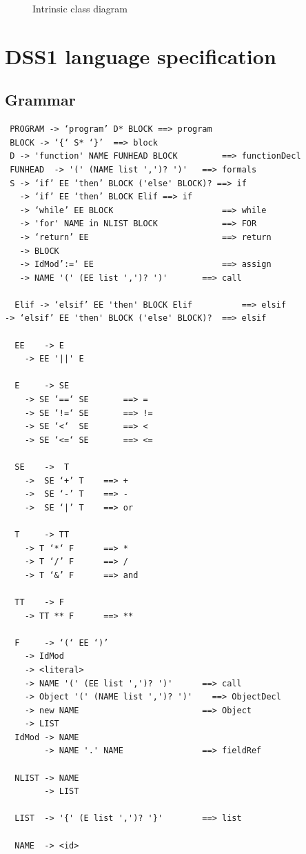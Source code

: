 \documentclass[12pt,letterpaper]{article}
\begin{document}
{\begin{figure}
\begin{center}
\begin{tikzpicture}[node distance=0.25in]
\end{tikzpicture}
\end{center}
\caption{Intrinsic class diagram}
\label{fig:INTRINSIC_DIAGRAM}
\end{figure}

\newpage \appendix 
\section{DSS1 language specification} \label{sec:LANGUAGE}

\subsection{Grammar}

\begin{verbatim}
 PROGRAM -> ‘program’ D* BLOCK ==> program
 BLOCK -> ‘{‘ S* ‘}’  ==> block
 D -> 'function' NAME FUNHEAD BLOCK      	==> functionDecl
 FUNHEAD  -> '(' (NAME list ',')? ')'  	==> formals
 S -> ‘if’ EE ‘then’ BLOCK ('else' BLOCK)? ==> if 
   -> ‘if’ EE ‘then’ BLOCK Elif ==> if 
   -> ‘while’ EE BLOCK               		==> while
   -> 'for' NAME in NLIST BLOCK     		==> FOR
   -> ‘return’ EE                    		==> return
   -> BLOCK
   -> IdMod’:=‘ EE                    		==> assign
   -> NAME '(' (EE list ',')? ')' 		==> call
 
  Elif -> ‘elsif’ EE 'then' BLOCK Elif			==> elsif
-> ‘elsif’ EE 'then' BLOCK ('else' BLOCK)?	==> elsif
  
  EE 	-> E
  	-> EE '||' E
  
  E 	-> SE
  	-> SE ‘==‘ SE   	==> =
  	-> SE ‘!=‘ SE   	==> !=
  	-> SE ‘<‘  SE   	==> <
  	-> SE ‘<=‘ SE   	==> <=
 
  SE 	->  T
  	->  SE ‘+’ T  	==> +
  	->  SE ‘-’ T  	==> -
  	->  SE ‘|’ T  	==> or
 
  T  	-> TT
  	-> T ‘*‘ F  	==> *
  	-> T ‘/’ F  	==> /
  	-> T ‘&’ F  	==> and
 
  TT 	-> F
  	-> TT ** F    	==> **
 
  F  	-> ‘(‘ EE ‘)’
  	-> IdMod 
  	-> <literal>
  	-> NAME '(' (EE list ',')? ')' 		==> call
  	-> Object '(' (NAME list ',')? ')'    ==> ObjectDecl
  	-> new NAME          				==> Object
  	-> LIST
  IdMod -> NAME
        -> NAME '.' NAME    			==> fieldRef
  
  NLIST	-> NAME
       	-> LIST
  
  LIST	-> '{' (E list ',')? '}'   		==> list
 
  NAME	-> <id>
\end{verbatim}

}
\end{document}
